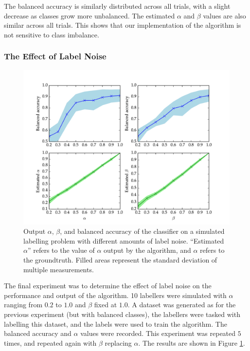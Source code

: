             The balanced accuracy is similarly distributed across all trials,
            with a slight decrease as classes grow more unbalanced. The
            estimated $\alpha$ and $\beta$ values are also similar across all
            trials. This shows that our implementation of the
            \citeauthor{raykar10} algorithm is not sensitive to class imbalance.

        \subsubsection{The Effect of Label Noise}

            \begin{figure}
                \centering
                \includegraphics[width=\textwidth]
                    {images/experiments/raykar_noise}
                \caption{Output $\alpha$, $\beta$, and balanced accuracy of the
                    \citeauthor{raykar10} classifier on a simulated labelling
                    problem with different amounts of label noise. ``Estimated
                    $\alpha$'' refers to the value of $\alpha$ output by the
                    algorithm, and $\alpha$ refers to the groundtruth. Filled
                    areas represent the standard deviation of multiple
                    measurements.}
                \label{fig:raykar-noise}
            \end{figure}

            The final experiment was to determine the effect of label noise on
            the performance and output of the algorithm. 10 labellers were
            simulated with $\alpha$ ranging from $0.2$ to $1.0$ and $\beta$
            fixed at $1.0$. A dataset was generated as for the previous
            experiment (but with balanced classes), the labellers were tasked
            with labelling this dataset, and the labels were used to train the
            algorithm. The balanced accuracy and $\alpha$ values were recorded.
            This experiment was repeated $5$ times, and repeated again with
            $\beta$ replacing $\alpha$. The results are shown in Figure
            \ref{fig:raykar-noise}.


